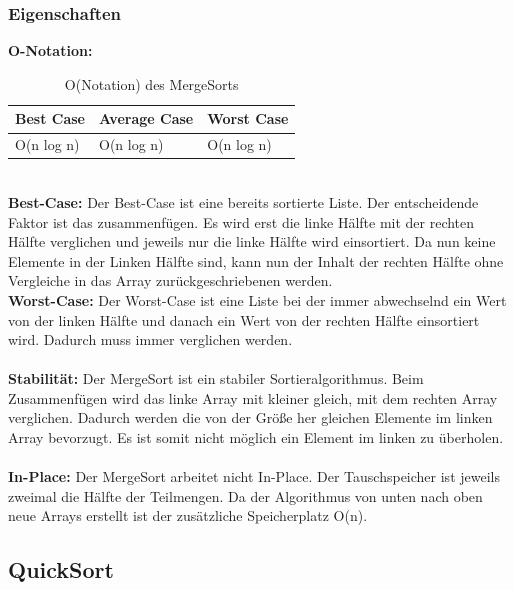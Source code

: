 \documentclass{article}
\begin{document}
\subsubsection{Eigenschaften}
\textbf{O-Notation:}
\begin{table}[h]
\centering
\begin{tabular}{lll}
	\hline
	\textbf{Best Case} & \textbf{Average Case} & \textbf{Worst Case} \\
	\hline
	O(n log n) & O(n log n) & O(n log n) \\
	\hline
\end{tabular}
\caption{O(Notation) des MergeSorts \cite{India2015Dataset}}
\label{tab:MergeSort}
\end{table}
\\
\textbf{Best-Case:} Der Best-Case ist eine bereits sortierte Liste. Der entscheidende Faktor ist das zusammenfügen. Es wird erst die linke Hälfte mit der rechten Hälfte verglichen und jeweils nur die linke Hälfte wird einsortiert. Da nun keine Elemente in der Linken Hälfte sind, kann nun der Inhalt der rechten Hälfte ohne Vergleiche in das Array zurückgeschriebenen werden.\\
\textbf{Worst-Case:} Der Worst-Case ist eine Liste bei der immer abwechselnd ein Wert von der linken Hälfte und danach ein Wert von der rechten Hälfte einsortiert wird. Dadurch muss immer verglichen werden.\\ \\
\textbf{Stabilität:}  Der MergeSort ist ein stabiler Sortieralgorithmus. Beim Zusammenfügen wird das linke Array mit kleiner gleich, mit dem rechten Array verglichen. Dadurch werden die von der Größe her gleichen Elemente im linken Array bevorzugt. Es ist somit nicht möglich ein Element im linken zu überholen.\\
\\
\textbf{In-Place:} Der MergeSort arbeitet nicht In-Place. Der Tauschspeicher ist jeweils zweimal die Hälfte der Teilmengen. Da der Algorithmus von unten nach oben neue Arrays erstellt ist der zusätzliche Speicherplatz O(n).   \\
\subsection{QuickSort}
\end{document}
